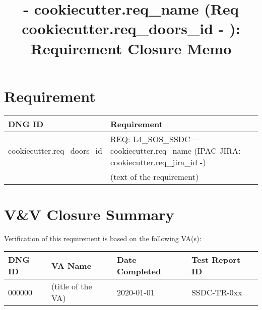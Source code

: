 \documentclass[TR]{spherex}
\title{ {{- cookiecutter.req_name }} (Req {{ cookiecutter.req_doors_id -}} ): Requirement Closure Memo}
\begin{document}
\maketitle


\begin{dochistory}
\end{dochistory}


\section*{Requirement}

\begin{longtable}{|l|p{}|}
\hline
\textbf{DNG ID} & \textbf{Requirement} \\
\endhead
\hline
{{ cookiecutter.req_doors_id }} & REQ: L4\_SOS\_SSDC --- {{ cookiecutter.req_name }} (IPAC JIRA: {{ cookiecutter.req_jira_id -}}) \\
 & (text of the requirement) \\
\hline
\end{longtable}


\section*{V\&V Closure Summary}

Verification of this requirement is based on the following VA(s):

\begin{longtable}{|l|l|l|l|}
\hline
\textbf{DNG ID} & \textbf{VA Name} & \textbf{Date Completed} & \textbf{Test Report ID} \\
\endhead
\hline
000000 & (title of the VA) & 2020-01-01 & SSDC-TR-0xx \\
\hline
\end{longtable}

\end{document}

